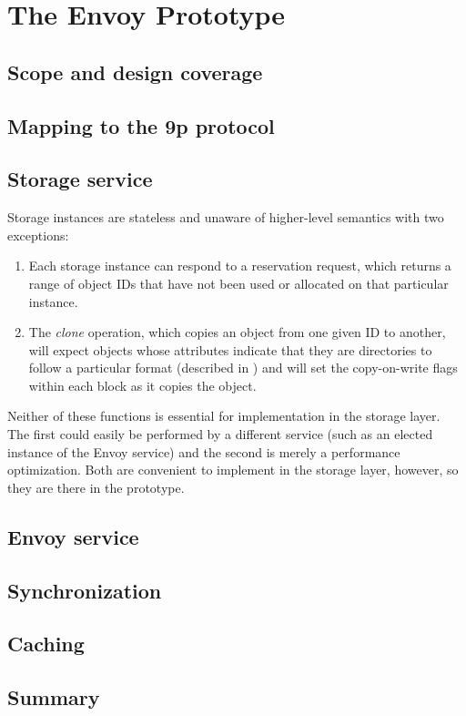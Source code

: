\chapter{The Envoy Prototype}

\section{Scope and design coverage}
\section{Mapping to the 9p protocol}
\section{Storage service}

Storage instances are stateless and unaware of higher-level semantics with two exceptions:

\begin{enumerate}
\item Each storage instance can respond to a reservation request, which returns a range of object IDs that have not been used or allocated on that particular instance.
\item The \emph{clone} operation, which copies an object from one given ID to another, will expect objects whose attributes indicate that they are directories to follow a particular format (described in ) and will set the copy-on-write flags within each block as it copies the object.
\end{enumerate}

Neither of these functions is essential for implementation in the storage layer. The first could easily be performed by a different service (such as an elected instance of the Envoy service) and the second is merely a performance optimization. Both are convenient to implement in the storage layer, however, so they are there in the prototype.

\section{Envoy service}
\section{Synchronization}
\section{Caching}

\section{Summary}